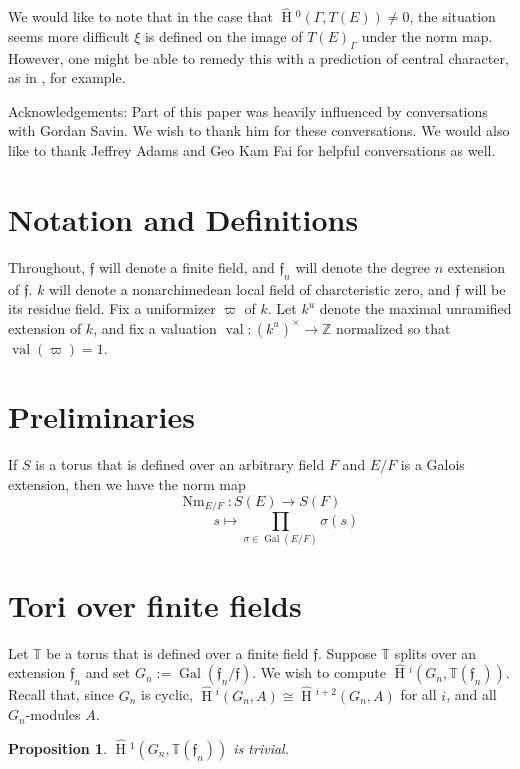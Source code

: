 \documentclass[11pt]{amsart}
\theoremstyle{plain}
\newtheorem{proposition}[theorem]{Proposition}
\newcommand{\HT}[1]{\hat{\HH}{}^{#1}}
\theoremstyle{definition}
\DeclareMathOperator{\Gal}{Gal}
\DeclareMathOperator{\val}{val}
\DeclareMathOperator{\HH}{H}
\DeclareMathOperator{\Nm}{Nm}
\begin{document}
We would like to note that in the case that $\HT{0}(\Gamma, T(E))
\neq 0$, the situation seems more difficult $\xi$ is defined on the
image of $T(E)_{\Gamma}$ under the norm map.  However, one might be
able to remedy this with a prediction of central character, as in
\cite{grossreeder}, for example.

Acknowledgements: Part of this paper was heavily influenced by
conversations with Gordan Savin.  We wish to thank him for these
conversations.  We would also like to thank Jeffrey Adams and Geo Kam
Fai for helpful conversations as well.

\section{Notation and Definitions}

Throughout, $\mathfrak{f}$ will denote a finite field, and
$\mathfrak{f}_n$ will denote the degree $n$ extension of
$\mathfrak{f}$.  $k$ will denote a nonarchimedean local field of
charcteristic zero, and $\mathfrak{f}$ will be its residue field.  Fix
a uniformizer $\varpi$ of $k$.  Let $k^u$ denote the maximal
unramified extension of $k$, and fix a valuation $\val : (k^u)^\times
\rightarrow \mathbb{Z}$ normalized so that $\val(\varpi) = 1$.

\section{Preliminaries}

If $S$ is a torus that is defined over an arbitrary field $F$ and
$E/F$ is a Galois extension, then we have the norm map
$$\Nm_{E/F} : S(E) \rightarrow S(F)$$ $$\ \ \ \ \ \ \ \ \ \ \ \ \ \ \ \ \ s \mapsto
\prod_{\sigma \in \Gal(E/F)} \sigma(s)$$

\section{Tori over finite fields}

Let $\mathbb{T}$ be a torus that is defined over a finite field
$\mathfrak{f}$.  Suppose $\mathbb{T}$ splits over an extension
$\mathfrak{f}_n$ and set $G_n := \Gal(\mathfrak{f}_n/\mathfrak{f})$.
We wish to compute $\HT{i}(G_n,\mathbb{T}(\mathfrak{f}_n))$.
Recall that, since $G_n$ is cyclic, $\HT{i}(G_n,A)\cong
\HT{i+2}(G_n,A)$ for all $i$, and all $G_n$-modules $A$.

\begin{proposition}\label{trivialH1finitefields}
$\HT{1}(G_n,\mathbb{T}(\mathfrak{f}_n))$ is trivial.
\end{proposition}
\end{document}

